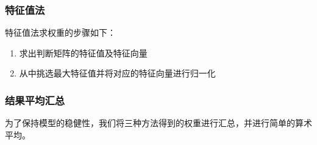 \documentclass[withoutpreface]{cumcmthesis}
\begin{document}
    \subsubsection{特征值法}

    特征值法求权重的步骤如下：

    \begin{enumerate}
        \item 求出判断矩阵的特征值及特征向量
        \item 从中挑选最大特征值并将对应的特征向量进行归一化
    \end{enumerate}

    \subsubsection{结果平均汇总}

    为了保持模型的稳健性，我们将三种方法得到的权重进行汇总，并进行简单的算术平均。
\end{document}
